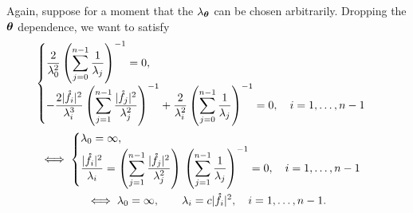 \documentclass{amsart}
\begin{document}
Again, suppose for a moment that the $\lambda_{\boldsymbol{\theta}}$ can be chosen arbitrarily.  Dropping the $\boldsymbol{\theta}$ dependence, we want to satisfy
\begin{gather*}
    \begin{cases}
    \displaystyle \frac {2}{\lambda_0^2} \left( \sum_{j=0}^{n-1} \frac{1}{\lambda_{j}} \right)^{-1}  = 0, \\ 
    \displaystyle - \frac{2\lvert\mathring{f}_i\rvert^2}{\lambda_{i}^3} \left( \sum_{j=1}^{n-1} \frac{\lvert\mathring{f}_j\rvert^2}{\lambda_{j}^2} \right)^{-1} +  \frac{2}{\lambda_i^2} \left( \sum_{j=0}^{n-1} \frac{1}{\lambda_{j}} \right)^{-1} = 0, \quad i = 1, \ldots, n-1
    \end{cases}
    \\
    \iff
    \begin{cases}
    \lambda_0 = \infty,  \\ 
    \displaystyle \frac{\lvert\mathring{f}_i\rvert^2}{\lambda_{i}} =  \left( \sum_{j=1}^{n-1} \frac{\lvert\mathring{f}_j\rvert^2}{\lambda_{j}^2} \right) \, \left( \sum_{j=1}^{n-1} \frac{1}{\lambda_{j}} \right)^{-1} = 0, \quad i = 1, \ldots, n-1
    \end{cases}
    \\
    \iff
     \lambda_0 = \infty, \qquad \lambda_i = c \lvert\mathring{f}_i\rvert^2, \quad i = 1, \ldots, n-1.
\end{gather*}



\end{document}
